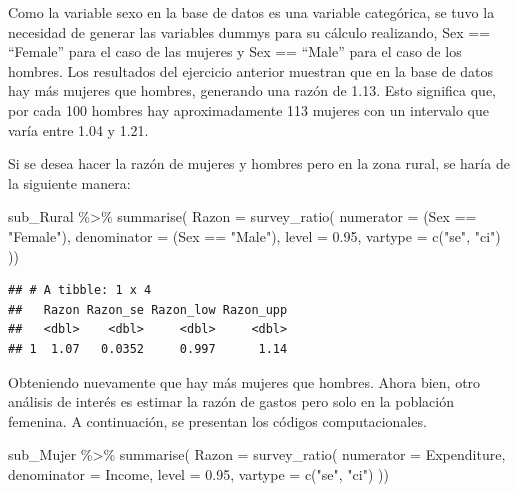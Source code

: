 \documentclass[
  12pt,
]{book}
\newenvironment{Shaded}{\begin{snugshade}}{\end{snugshade}}
\newcommand{\AttributeTok}[1]{\textcolor[rgb]{0.77,0.63,0.00}{#1}}
\newcommand{\FloatTok}[1]{\textcolor[rgb]{0.00,0.00,0.81}{#1}}
\newcommand{\FunctionTok}[1]{\textcolor[rgb]{0.00,0.00,0.00}{#1}}
\newcommand{\NormalTok}[1]{#1}
\newcommand{\SpecialCharTok}[1]{\textcolor[rgb]{0.00,0.00,0.00}{#1}}
\newcommand{\StringTok}[1]{\textcolor[rgb]{0.31,0.60,0.02}{#1}}
\begin{document}
Como la variable sexo en la base de datos es una variable categórica, se tuvo la necesidad de generar las variables dummys para su cálculo realizando, Sex == ``Female'' para el caso de las mujeres y Sex == ``Male'' para el caso de los hombres. Los resultados del ejercicio anterior muestran que en la base de datos hay más mujeres que hombres, generando una razón de 1.13. Esto significa que, por cada 100 hombres hay aproximadamente 113 mujeres con un intervalo que varía entre 1.04 y 1.21.

Si se desea hacer la razón de mujeres y hombres pero en la zona rural, se haría de la siguiente manera:

\begin{Shaded}
\begin{Highlighting}[]
\NormalTok{sub\_Rural }\SpecialCharTok{\%\textgreater{}\%} \FunctionTok{summarise}\NormalTok{(}
    \AttributeTok{Razon =}  \FunctionTok{survey\_ratio}\NormalTok{(}
      \AttributeTok{numerator =}\NormalTok{ (Sex }\SpecialCharTok{==} \StringTok{"Female"}\NormalTok{),}
      \AttributeTok{denominator =}\NormalTok{ (Sex }\SpecialCharTok{==} \StringTok{"Male"}\NormalTok{),}
      \AttributeTok{level =} \FloatTok{0.95}\NormalTok{,}
    \AttributeTok{vartype =}  \FunctionTok{c}\NormalTok{(}\StringTok{"se"}\NormalTok{, }\StringTok{"ci"}\NormalTok{)}
\NormalTok{    ))}
\end{Highlighting}
\end{Shaded}

\begin{verbatim}
## # A tibble: 1 x 4
##   Razon Razon_se Razon_low Razon_upp
##   <dbl>    <dbl>     <dbl>     <dbl>
## 1  1.07   0.0352     0.997      1.14
\end{verbatim}

Obteniendo nuevamente que hay más mujeres que hombres. Ahora bien, otro análisis de interés es estimar la razón de gastos pero solo en la población femenina. A continuación, se presentan los códigos computacionales.

\begin{Shaded}
\begin{Highlighting}[]
\NormalTok{sub\_Mujer }\SpecialCharTok{\%\textgreater{}\%} \FunctionTok{summarise}\NormalTok{(}
    \AttributeTok{Razon =}  \FunctionTok{survey\_ratio}\NormalTok{(}
      \AttributeTok{numerator =}\NormalTok{ Expenditure,}
      \AttributeTok{denominator =}\NormalTok{ Income,}
      \AttributeTok{level =} \FloatTok{0.95}\NormalTok{,}
    \AttributeTok{vartype =}  \FunctionTok{c}\NormalTok{(}\StringTok{"se"}\NormalTok{, }\StringTok{"ci"}\NormalTok{)}
\NormalTok{    ))}
\end{Highlighting}
\end{Shaded}
\end{document}
